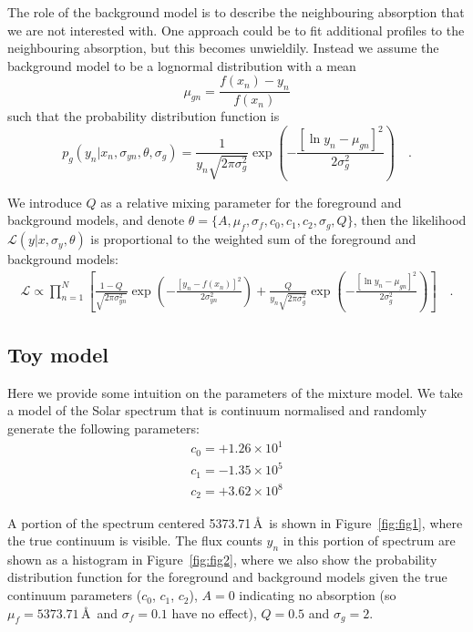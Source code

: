 \documentclass[onecolumn]{aastex62}
\newcommand{\likelihood}{\mathcal{L}}
\begin{document}
The role of the background model is to describe the neighbouring absorption
that we are not interested with. One approach could be to fit additional
profiles to the neighbouring absorption, but this becomes unwieldily.
Instead we assume the background model to be a lognormal distribution
with a mean
\begin{equation}
	\mu_{gn} = \frac{f(x_n) - y_n}{f(x_n)}
\end{equation}
\noindent{}such that the probability distribution function is
\begin{equation}
	p_{g}\left(y_n|x_n,\sigma_{yn},\theta,\sigma_g\right) = \frac{1}{y_n\sqrt{2\pi\sigma^2_{g}}}\exp\left(-\frac{\left[\ln{y_n}-\mu_{gn}\right]^2}{2\sigma^2_g}\right) \quad .
\end{equation}

We introduce $Q$ as a relative mixing parameter for the foreground and background models, and
denote ${\theta = \{A,\mu_f,\sigma_f,c_0,c_1,c_2,\sigma_g,Q\}}$, then the 
likelihood $\likelihood\left(y|x,\sigma_y,\theta\right)$ is proportional to the weighted
sum of the foreground and background models:
\begin{eqnarray}
	\likelihood \propto \prod_{n=1}^{N} \left[\frac{1 - Q}{\sqrt{2\pi\sigma^2_{yn}}}\exp\left(-\frac{\left[y_{n} - f(x_n)\right]^2}{2\sigma^2_{yn}}\right) + \frac{Q}{y_{n}\sqrt{2\pi\sigma^2_{g}}}\exp\left(-\frac{\left[\ln{y_n}-\mu_{gn}\right]^2}{2\sigma^2_g}\right)\right] \quad .
\end{eqnarray}

\the\textwidth

\subsection{Toy model}

Here we provide some intuition on the parameters of the mixture model. We take a model
of the Solar spectrum that is continuum normalised and randomly generate the following 
parameters:
\begin{eqnarray}
	c_0 = +1.26\times10^1 \\
	c_1 = -1.35\times10^5 \\
	c_2 = +3.62\times10^8
\end{eqnarray}

A portion of the spectrum centered 5373.71\,\AA\ is shown in Figure~\ref{fig:fig1}, where 
the true continuum is visible. The flux counts $y_{n}$ in this portion of spectrum are
shown as a histogram in Figure~\ref{fig:fig2}, where we also show the probability
distribution function for the foreground and background models given the true
continuum parameters ($c_0$, $c_1$, $c_2$), $A = 0$ indicating no absorption
(so $\mu_f = 5373.71$\,\AA\ and $\sigma_f = 0.1$ have no effect), $Q = 0.5$ and
$\sigma_g = 2$.
\end{document}
